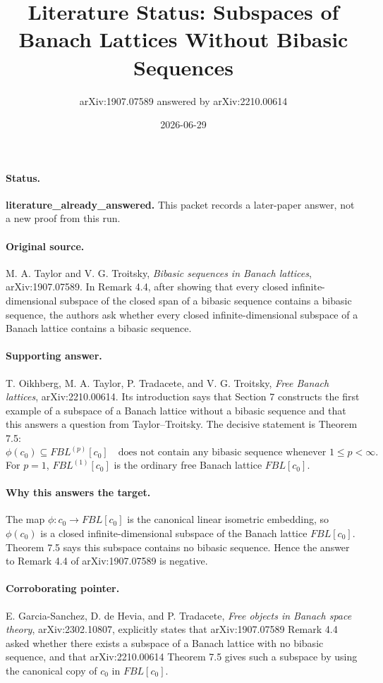 \documentclass[11pt]{article}
\title{Literature Status: Subspaces of Banach Lattices Without Bibasic Sequences}
\author{arXiv:1907.07589 answered by arXiv:2210.00614}
\date{2026-06-29}
\begin{document}
\maketitle

\paragraph{Status.}
\textbf{literature\_already\_answered.}  This packet records a later-paper answer, not a new proof from this run.

\paragraph{Original source.}
M. A. Taylor and V. G. Troitsky, \emph{Bibasic sequences in Banach lattices}, arXiv:1907.07589.
In Remark 4.4, after showing that every closed infinite-dimensional subspace of the closed span of a bibasic sequence contains a bibasic sequence, the authors ask whether every closed infinite-dimensional subspace of a Banach lattice contains a bibasic sequence.

\paragraph{Supporting answer.}
T. Oikhberg, M. A. Taylor, P. Tradacete, and V. G. Troitsky, \emph{Free Banach lattices}, arXiv:2210.00614.
Its introduction says that Section 7 constructs the first example of a subspace of a Banach lattice without a bibasic sequence and that this answers a question from Taylor--Troitsky.  The decisive statement is Theorem 7.5:
\[
  \phi(c_0)\subseteq FBL^{(p)}[c_0]
  \quad\text{does not contain any bibasic sequence whenever }1\le p<\infty.
\]
For \(p=1\), \(FBL^{(1)}[c_0]\) is the ordinary free Banach lattice \(FBL[c_0]\).

\paragraph{Why this answers the target.}
The map \(\phi:c_0\to FBL[c_0]\) is the canonical linear isometric embedding, so \(\phi(c_0)\) is a closed infinite-dimensional subspace of the Banach lattice \(FBL[c_0]\).  Theorem 7.5 says this subspace contains no bibasic sequence.  Hence the answer to Remark 4.4 of arXiv:1907.07589 is negative.

\paragraph{Corroborating pointer.}
E. Garcia-Sanchez, D. de Hevia, and P. Tradacete, \emph{Free objects in Banach space theory}, arXiv:2302.10807, explicitly states that arXiv:1907.07589 Remark 4.4 asked whether there exists a subspace of a Banach lattice with no bibasic sequence, and that arXiv:2210.00614 Theorem 7.5 gives such a subspace by using the canonical copy of \(c_0\) in \(FBL[c_0]\).
\end{document}
